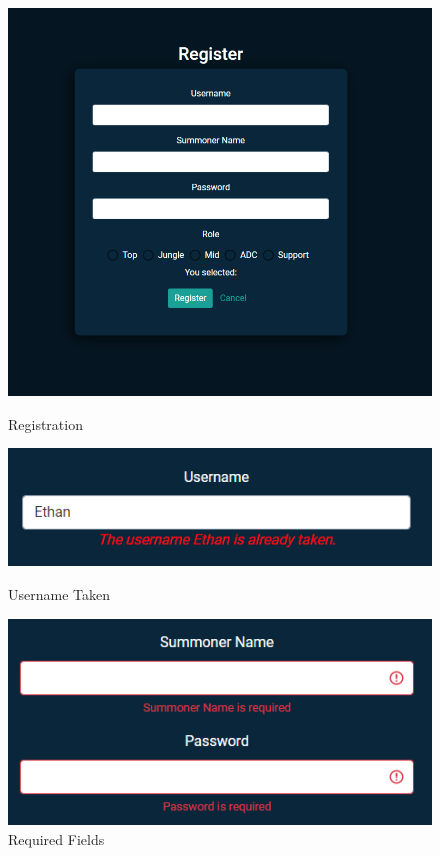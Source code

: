 \begin{figure}[H]	
	\centering
	\includegraphics[width=\textwidth/2,height=\textheight/2,keepaspectratio]{img/Register.png}
	\caption{Registration}
	\label{tikz:reg}
	\centering
	\includegraphics[width=\textwidth/2,height=\textheight/2,keepaspectratio]{img/UsernameTaken.png}
	\caption{Username Taken}
	\label{tikz:taken}
	\centering
	\includegraphics[width=\textwidth/2,height=\textheight/2,keepaspectratio]{img/RequiredFields.png}
	\caption{Required Fields}
	\label{tikz:fields}
\end{figure}


